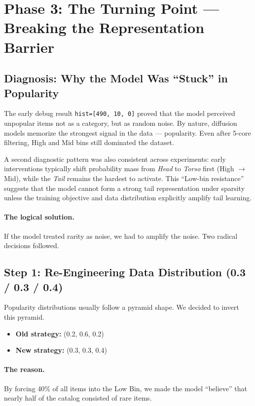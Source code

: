 \documentclass[11pt,a4paper]{article}
\begin{document}
\section{Phase 3: The Turning Point --- Breaking the Representation Barrier}

\subsection{Diagnosis: Why the Model Was ``Stuck'' in Popularity}
The early debug result \texttt{hist=[490, 10, 0]} proved that the model perceived unpopular items not as a category, but as random noise. By nature, diffusion models memorize the strongest signal in the data --- popularity. Even after 5-core filtering, High and Mid bins still dominated the dataset.

A second diagnostic pattern was also consistent across experiments: early interventions typically shift probability mass from \emph{Head} to \emph{Torso} first (High $\rightarrow$ Mid), while the \emph{Tail} remains the hardest to activate. This ``Low-bin resistance'' suggests that the model cannot form a strong tail representation under sparsity unless the training objective and data distribution explicitly amplify tail learning.

\paragraph{The logical solution.}
If the model treated rarity as noise, we had to amplify the noise. Two radical decisions followed.

\subsection{Step 1: Re-Engineering Data Distribution (0.3 / 0.3 / 0.4)}
Popularity distributions usually follow a pyramid shape. We decided to invert this pyramid.

\begin{itemize}[leftmargin=1.4em]
  \item \textbf{Old strategy:} (0.2, 0.6, 0.2)
  \item \textbf{New strategy:} (0.3, 0.3, 0.4)
\end{itemize}

\paragraph{The reason.}
By forcing 40\% of all items into the Low Bin, we made the model ``believe'' that nearly half of the catalog consisted of rare items.
\end{document}
